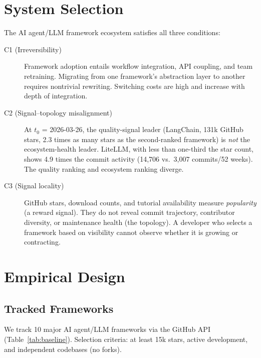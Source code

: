 \documentclass[12pt]{article}
\begin{document}
\section{System Selection}

The AI agent/LLM framework ecosystem satisfies all three conditions:

\begin{description}
\item[C1 (Irreversibility)] Framework adoption entails workflow integration, API coupling, and team retraining. Migrating from one framework's abstraction layer to another requires nontrivial rewriting. Switching costs are high and increase with depth of integration.

\item[C2 (Signal--topology misalignment)] At $t_0$ = 2026-03-26, the quality-signal leader (LangChain, 131k GitHub stars, 2.3 times as many stars as the second-ranked framework) is \emph{not} the ecosystem-health leader. LiteLLM, with less than one-third the star count, shows 4.9 times the commit activity (14,706 vs.\ 3,007 commits/52 weeks). The quality ranking and ecosystem ranking diverge.

\item[C3 (Signal locality)] GitHub stars, download counts, and tutorial availability measure \emph{popularity} (a reward signal). They do not reveal commit trajectory, contributor diversity, or maintenance health (the topology). A developer who selects a framework based on visibility cannot observe whether it is growing or contracting.
\end{description}

\section{Empirical Design}

\subsection{Tracked Frameworks}

We track 10 major AI agent/LLM frameworks via the GitHub API (Table~\ref{tab:baseline}). Selection criteria: at least 15k stars, active development, and independent codebases (no forks).
\end{document}
